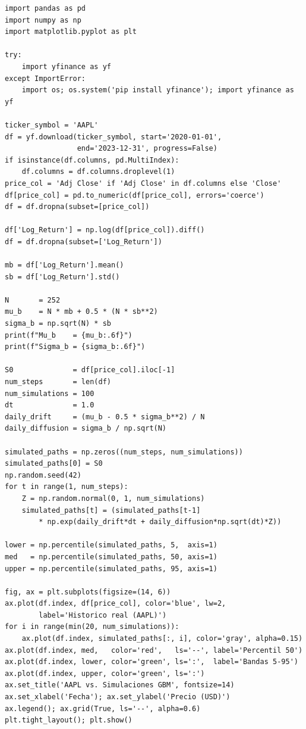 \documentclass[12pt,letterpaper]{article}
\begin{document}
\begin{lstlisting}[style=python, caption={Laboratorio 1 -- GBM con AAPL}]
import pandas as pd
import numpy as np
import matplotlib.pyplot as plt

try:
    import yfinance as yf
except ImportError:
    import os; os.system('pip install yfinance'); import yfinance as yf

ticker_symbol = 'AAPL'
df = yf.download(ticker_symbol, start='2020-01-01',
                 end='2023-12-31', progress=False)
if isinstance(df.columns, pd.MultiIndex):
    df.columns = df.columns.droplevel(1)
price_col = 'Adj Close' if 'Adj Close' in df.columns else 'Close'
df[price_col] = pd.to_numeric(df[price_col], errors='coerce')
df = df.dropna(subset=[price_col])

df['Log_Return'] = np.log(df[price_col]).diff()
df = df.dropna(subset=['Log_Return'])

mb = df['Log_Return'].mean()
sb = df['Log_Return'].std()

N       = 252
mu_b    = N * mb + 0.5 * (N * sb**2)
sigma_b = np.sqrt(N) * sb
print(f"Mu_b    = {mu_b:.6f}")
print(f"Sigma_b = {sigma_b:.6f}")

S0              = df[price_col].iloc[-1]
num_steps       = len(df)
num_simulations = 100
dt              = 1.0
daily_drift     = (mu_b - 0.5 * sigma_b**2) / N
daily_diffusion = sigma_b / np.sqrt(N)

simulated_paths = np.zeros((num_steps, num_simulations))
simulated_paths[0] = S0
np.random.seed(42)
for t in range(1, num_steps):
    Z = np.random.normal(0, 1, num_simulations)
    simulated_paths[t] = (simulated_paths[t-1]
        * np.exp(daily_drift*dt + daily_diffusion*np.sqrt(dt)*Z))

lower = np.percentile(simulated_paths, 5,  axis=1)
med   = np.percentile(simulated_paths, 50, axis=1)
upper = np.percentile(simulated_paths, 95, axis=1)

fig, ax = plt.subplots(figsize=(14, 6))
ax.plot(df.index, df[price_col], color='blue', lw=2,
        label='Historico real (AAPL)')
for i in range(min(20, num_simulations)):
    ax.plot(df.index, simulated_paths[:, i], color='gray', alpha=0.15)
ax.plot(df.index, med,   color='red',   ls='--', label='Percentil 50')
ax.plot(df.index, lower, color='green', ls=':',  label='Bandas 5-95')
ax.plot(df.index, upper, color='green', ls=':')
ax.set_title('AAPL vs. Simulaciones GBM', fontsize=14)
ax.set_xlabel('Fecha'); ax.set_ylabel('Precio (USD)')
ax.legend(); ax.grid(True, ls='--', alpha=0.6)
plt.tight_layout(); plt.show()
\end{lstlisting}
\end{document}
